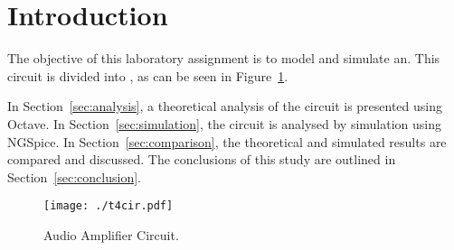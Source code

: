 \section{Introduction}
\label{sec:introduction}


The objective of this laboratory assignment is to model and simulate an. This circuit is divided into , as can be seen in Figure~\ref{fig:cir}.

In Section~\ref{sec:analysis}, a theoretical analysis of the circuit is presented using Octave. In Section~\ref{sec:simulation}, the circuit is analysed by simulation using NGSpice. In Section~\ref{sec:comparison}, the theoretical and simulated results are compared and discussed. The conclusions of this study are outlined in
Section~\ref{sec:conclusion}.

\begin{figure}[h] \centering
\texttt{[image: ./t4cir.pdf]}
\caption{Audio Amplifier Circuit.}
\label{fig:cir}
\end{figure}
